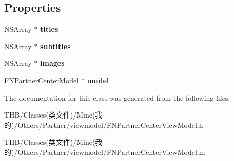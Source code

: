 \subsection*{Properties}
\begin{DoxyCompactItemize}
\item 
\mbox{\label{interface_f_n_partner_center_view_model_a4a3d5288800b14b17ea6c7920508ba6c}} 
N\+S\+Array $\ast$ {\bfseries titles}
\item 
\mbox{\label{interface_f_n_partner_center_view_model_a85d6f1af38d714161c6024aca196038e}} 
N\+S\+Array $\ast$ {\bfseries subtitles}
\item 
\mbox{\label{interface_f_n_partner_center_view_model_a94deb72fdb98379e3932a47771fc54fe}} 
N\+S\+Array $\ast$ {\bfseries images}
\item 
\mbox{\label{interface_f_n_partner_center_view_model_a0a9350a6c03d197c81eac4bedfb51d8b}} 
\mbox{\hyperlink{interface_f_n_partner_center_model}{F\+N\+Partner\+Center\+Model}} $\ast$ {\bfseries model}
\end{DoxyCompactItemize}


The documentation for this class was generated from the following files\+:\begin{DoxyCompactItemize}
\item 
T\+H\+B/\+Classes(类文件)/\+Mine(我的)/\+Others/\+Partner/viewmodel/F\+N\+Partner\+Center\+View\+Model.\+h\item 
T\+H\+B/\+Classes(类文件)/\+Mine(我的)/\+Others/\+Partner/viewmodel/F\+N\+Partner\+Center\+View\+Model.\+m\end{DoxyCompactItemize}
